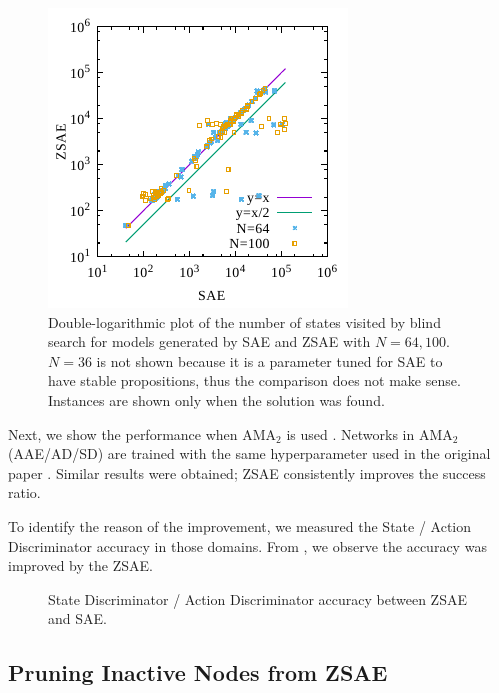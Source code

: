 \begin{figure}[htb]
 \centering
 \includegraphics{img/static/gen.pdf}
 \caption{Double-logarithmic plot of the number of states visited by blind search
for models generated by SAE and ZSAE with $N=64,100$. $N=36$ is not shown because
it is a parameter tuned for SAE to have stable propositions, thus the comparison does not make sense.
 Instances are shown only when the solution was found.}
 \label{fig:ama1-visited}
\end{figure}


Next, we show the performance when AMA$_2$ is used
. Networks in AMA$_2$ (AAE/AD/SD) are trained with the same hyperparameter 
used in the original paper \cite{Asai2018}.
Similar results were obtained; ZSAE consistently improves the success ratio.

\begin{table}[htb]
 \vspace{1.5in}
 \caption{}
 \label{tab:ama2}
\end{table}

To identify the reason of the improvement, we measured the State / Action Discriminator accuracy in those domains.
From , we observe the accuracy was improved by the ZSAE.

\begin{figure}[htb]
 \vspace{1.5in}
 \caption{State Discriminator / Action Discriminator accuracy between ZSAE and SAE.}
 \label{fig:ama2-ad}
\end{figure}

\subsection{Pruning Inactive Nodes from ZSAE}

